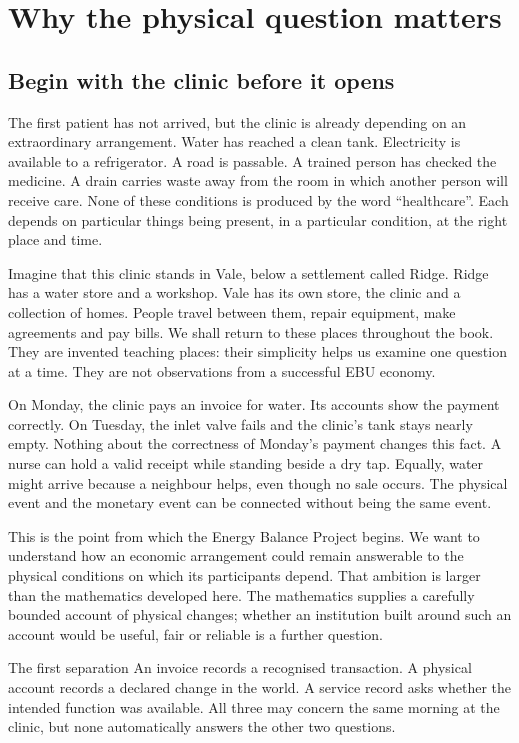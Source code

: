 \chapter{Why the physical question matters}\label{ch:motivation}

\section{Begin with the clinic before it opens}
The first patient has not arrived, but the clinic is already depending on an extraordinary arrangement. Water has reached a clean tank. Electricity is available to a refrigerator. A road is passable. A trained person has checked the medicine. A drain carries waste away from the room in which another person will receive care. None of these conditions is produced by the word ``healthcare''. Each depends on particular things being present, in a particular condition, at the right place and time.

Imagine that this clinic stands in Vale, below a settlement called Ridge. Ridge has a water store and a workshop. Vale has its own store, the clinic and a collection of homes. People travel between them, repair equipment, make agreements and pay bills. We shall return to these places throughout the book. They are invented teaching places: their simplicity helps us examine one question at a time. They are not observations from a successful EBU economy.

On Monday, the clinic pays an invoice for water. Its accounts show the payment correctly. On Tuesday, the inlet valve fails and the clinic's tank stays nearly empty. Nothing about the correctness of Monday's payment changes this fact. A nurse can hold a valid receipt while standing beside a dry tap. Equally, water might arrive because a neighbour helps, even though no sale occurs. The physical event and the monetary event can be connected without being the same event.

This is the point from which the Energy Balance Project begins. We want to understand how an economic arrangement could remain answerable to the physical conditions on which its participants depend. That ambition is larger than the mathematics developed here. The mathematics supplies a carefully bounded account of physical changes; whether an institution built around such an account would be useful, fair or reliable is a further question.

\begin{intuitionbox}{The first separation}
An invoice records a recognised transaction. A physical account records a declared change in the world. A service record asks whether the intended function was available. All three may concern the same morning at the clinic, but none automatically answers the other two questions.
\end{intuitionbox}

